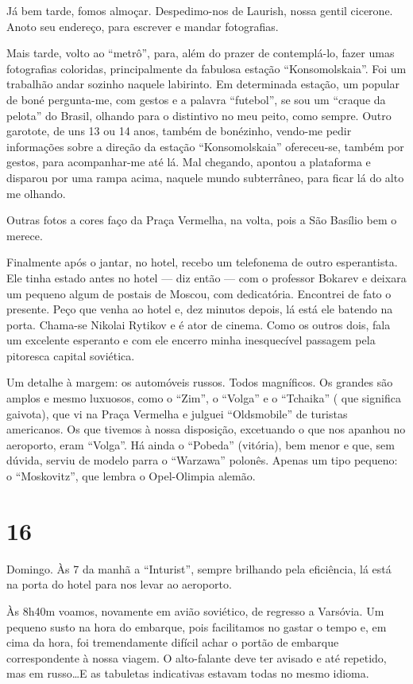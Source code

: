 Já bem tarde, fomos almoçar. Despedimo-nos de Laurish, nossa gentil cicerone. Anoto seu endereço, para escrever e mandar fotografias.

Mais tarde, volto ao ``metrô'', para, além do prazer de contemplá-lo, fazer umas fotografias coloridas, principalmente da fabulosa estação ``Konsomolskaia''. Foi um trabalhão andar sozinho naquele labirinto. Em determinada estação, um popular de boné pergunta-me, com gestos e a palavra ``futebol'', se sou um ``craque da pelota'' do Brasil, olhando para o distintivo no meu peito, como sempre. Outro garotote, de uns 13 ou 14 anos, também de bonézinho, vendo-me pedir informações sobre a direção da estação ``Konsomolskaia'' ofereceu-se, também por gestos, para acompanhar-me até lá. Mal chegando, apontou a plataforma e disparou por uma rampa acima, naquele mundo subterrâneo, para ficar lá do alto me olhando.

Outras fotos a cores faço da Praça Vermelha, na volta, pois a São Basílio bem o merece.

Finalmente após o jantar, no hotel, recebo um telefonema de outro esperantista. Ele tinha estado antes no hotel --- diz então --- com o professor Bokarev e deixara um pequeno algum de postais de Moscou, com dedicatória. Encontrei de fato o presente. Peço que venha ao hotel e, dez minutos depois, lá está ele batendo na porta. Chama-se Nikolai Rytikov e é ator de cinema. Como os outros dois, fala um excelente esperanto e com ele encerro minha inesquecível passagem pela pitoresca capital soviética.

Um detalhe à margem: os automóveis russos. Todos magníficos. Os grandes são amplos e mesmo luxuosos, como o ``Zim'', o ``Volga'' e o ``Tchaika'' ( que significa gaivota), que vi na Praça Vermelha e julguei ``Oldsmobile'' de turistas americanos. Os que tivemos à nossa disposição, excetuando o que nos apanhou no aeroporto, eram ``Volga''. Há ainda o ``Pobeda'' (vitória), bem menor e que, sem dúvida, serviu de modelo parra o ``Warzawa'' polonês. Apenas um tipo pequeno: o ``Moskovitz'', que lembra o Opel-Olimpia alemão.

\section*{16 \adfflatleafright {}}
Domingo. Às 7 da manhã a ``Inturist'', sempre brilhando pela eficiência, lá está na porta do hotel para nos levar ao aeroporto.

Às 8h40m voamos, novamente em avião soviético, de regresso a Varsóvia. Um pequeno susto na hora do embarque, pois facilitamos no gastar o tempo e, em cima da hora, foi tremendamente difícil achar o portão de embarque correspondente à nossa viagem. O alto-falante deve ter avisado e até repetido, mas em russo\ldots E as tabuletas indicativas estavam todas no mesmo idioma.

